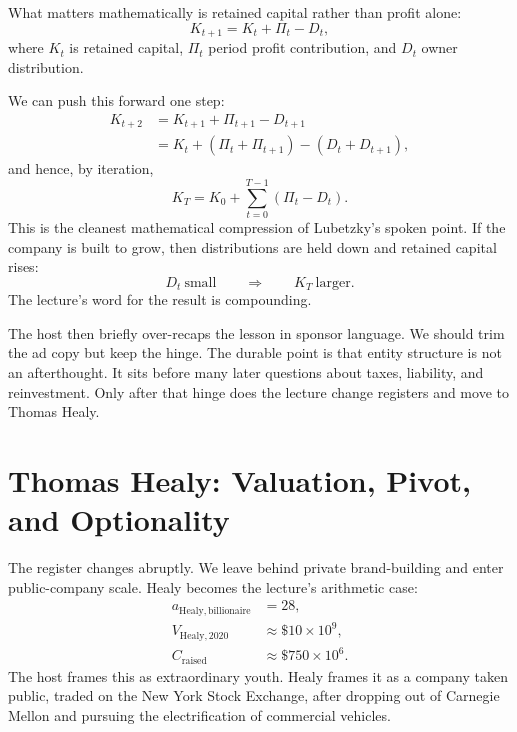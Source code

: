 What matters mathematically is retained capital rather than profit alone:
\begin{equation}
K_{t+1}=K_t+\Pi_t-D_t,
\end{equation}
where \(K_t\) is retained capital, \(\Pi_t\) period profit contribution, and \(D_t\) owner distribution.

We can push this forward one step:
\begin{align}
K_{t+2}
&=K_{t+1}+\Pi_{t+1}-D_{t+1}\\
&=K_t+(\Pi_t+\Pi_{t+1})-(D_t+D_{t+1}),
\end{align}
and hence, by iteration,
\begin{equation}
K_T=K_0+\sum_{t=0}^{T-1}(\Pi_t-D_t).
\end{equation}
This is the cleanest mathematical compression of Lubetzky's spoken point. If the company is built to grow, then distributions are held down and retained capital rises:
\begin{equation}
D_t\ \text{small} \qquad \Longrightarrow \qquad K_T\ \text{larger}.
\end{equation}
The lecture's word for the result is compounding.

The host then briefly over-recaps the lesson in sponsor language. We should trim the ad copy but keep the hinge. The durable point is that entity structure is not an afterthought. It sits before many later questions about taxes, liability, and reinvestment. Only after that hinge does the lecture change registers and move to Thomas Healy.

\section{Thomas Healy: Valuation, Pivot, and Optionality}

The register changes abruptly. We leave behind private brand-building and enter public-company scale. Healy becomes the lecture's arithmetic case:
\begin{align}
a_{\mathrm{Healy,billionaire}}&=28,\\
V_{\mathrm{Healy},2020}&\approx \$10\times 10^{9},\\
C_{\mathrm{raised}}&\approx \$750\times 10^{6}.
\end{align}
The host frames this as extraordinary youth. Healy frames it as a company taken public, traded on the New York Stock Exchange, after dropping out of Carnegie Mellon and pursuing the electrification of commercial vehicles.

